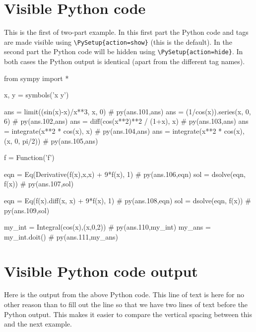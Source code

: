 \documentclass[12pt]{pylatex}
\begin{document}
\section*{Visible Python code}

This is the first of two-part example. In this first part the Python code and tags are made visible using {\tt\small\verb|\PySetup{action=show}|} (this is the default). In the second part the Python code will be hidden using {\tt\small\verb|\PySetup{action=hide}|}. In both cases the Python output is identical (apart from the different tag names).

\vspace{12pt}


\begin{python}
   from sympy import *

   x, y = symbols('x y')

   ans = limit((sin(x)-x)/x**3, x, 0)               # py(ans.101,ans)
   ans = (1/cos(x)).series(x, 0, 6)                 # py(ans.102,ans)
   ans = diff(cos(x**2)**2 / (1+x), x)              # py(ans.103,ans)
   ans = integrate(x**2 * cos(x), x)                # py(ans.104,ans)
   ans = integrate(x**2 * cos(x), (x, 0, pi/2))     # py(ans.105,ans)

   f = Function('f')

   eqn = Eq(Derivative(f(x),x,x) + 9*f(x), 1)       # py(ans.106,eqn)
   sol = dsolve(eqn, f(x))                          # py(ans.107,sol)

   eqn = Eq(f(x).diff(x, x) + 9*f(x), 1)            # py(ans.108,eqn)
   sol = dsolve(eqn, f(x))                          # py(ans.109,sol)

   my_int = Integral(cos(x),(x,0,2))                # py(ans.110,my_int)
   my_ans = my_int.doit()                           # py(ans.111,my_ans)
\end{python}

\clearpage

\section*{Visible Python code output}

Here is the output from the above Python code. This line of text is here for no other reason than to fill out the line so that we have two lines of text before the Python output. This makes it easier to compare the vertical spacing between this and the next example.
\end{document}

